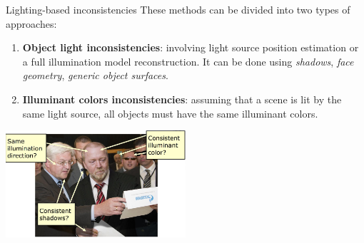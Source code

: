 \begin{tframe}{Lighting-based inconsistencies}
\vspace{0.1cm}
These methods can be divided into two types of approaches:
\vspace{0.2cm}
\begin{enumerate}
\item \textbf{Object light inconsistencies}: {\small involving light source position estimation or a full illumination model reconstruction. It can be done using \emph{shadows}, \emph{face geometry}, \emph{generic object surfaces}}.
\vspace{0.2cm}

\item \textbf{Illuminant colors inconsistencies}: {\small assuming that a scene is lit by the same light source, all objects must have the same illuminant colors.}
\vspace{0.3cm}
\end{enumerate}
\begin{center}
\includegraphics[width=0.5\textwidth]{images/lighting-based.jpg}
\end{center}
\end{tframe}


